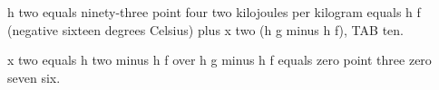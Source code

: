 h two equals ninety-three point four two kilojoules per kilogram equals h f (negative sixteen degrees Celsius) plus x two (h g minus h f), TAB ten. 

x two equals h two minus h f over h g minus h f equals zero point three zero seven six.